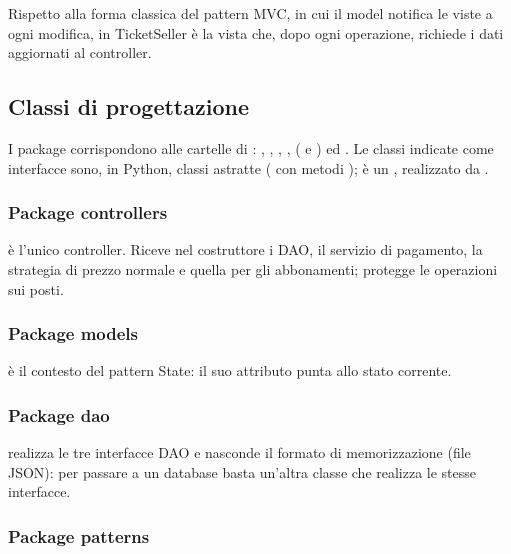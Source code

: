 Rispetto alla forma classica del pattern MVC, in cui il model notifica le viste a ogni modifica, in TicketSeller è la vista che, dopo ogni operazione, richiede i dati aggiornati al controller.

\subsection{Classi di progettazione}


I package corrispondono alle cartelle di : , , , ,  ( e ) ed . Le classi indicate come interfacce sono, in Python, classi astratte ( con metodi );  è un , realizzato da .

\subsubsection*{Package controllers}
 è l'unico controller. Riceve nel costruttore i DAO, il servizio di pagamento, la strategia di prezzo normale e quella per gli abbonamenti;  protegge le operazioni sui posti.

\subsubsection*{Package models}
 è il contesto del pattern State: il suo attributo  punta allo stato corrente.

\subsubsection*{Package dao}
 realizza le tre interfacce DAO e nasconde il formato di memorizzazione (file JSON): per passare a un database basta un'altra classe che realizza le stesse interfacce.

\subsubsection*{Package patterns}

